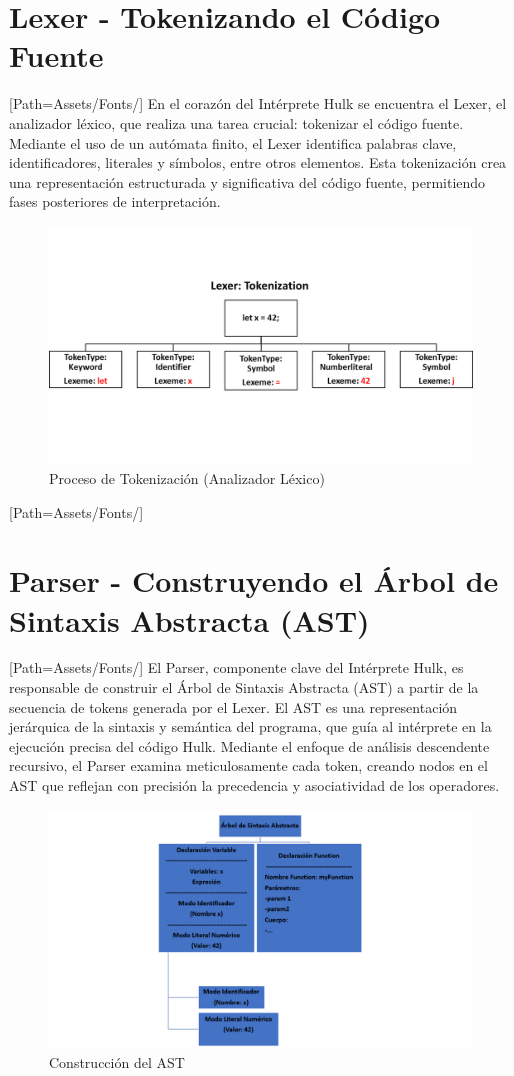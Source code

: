 \documentclass{article}
\begin{document}
\section{Lexer - Tokenizando el Código Fuente}
    \setmainfont{LEMONMILK-Regular.otf}[Path=Assets/Fonts/]
    En el corazón del Intérprete Hulk se encuentra el Lexer, el analizador léxico, que realiza una tarea crucial: tokenizar el código fuente. Mediante el uso de un autómata finito, el Lexer identifica palabras clave, identificadores, literales y símbolos, entre otros elementos. Esta tokenización crea una representación estructurada y significativa del código fuente, permitiendo fases posteriores de interpretación.
    \begin{figure}[ht]
        \centering
        \includegraphics[width=0.5\linewidth]{Assets/Tokenization.png} %
        \caption{Proceso de Tokenización (Analizador Léxico)}
        \label{fig:tokenizacion}
    \end{figure}
\newpage

\setmainfont{LEMONMILK-Bold.otf}[Path=Assets/Fonts/]
\section{Parser - Construyendo el Árbol de Sintaxis Abstracta (AST)}
    \setmainfont{LEMONMILK-Regular.otf}[Path=Assets/Fonts/]
    El Parser, componente clave del Intérprete Hulk, es responsable de construir el Árbol de Sintaxis Abstracta (AST) a partir de la secuencia de tokens generada por el Lexer. El AST es una representación jerárquica de la sintaxis y semántica del programa, que guía al intérprete en la ejecución precisa del código Hulk. Mediante el enfoque de análisis descendente recursivo, el Parser examina meticulosamente cada token, creando nodos en el AST que reflejan con precisión la precedencia y asociatividad de los operadores.
    \begin{figure}[ht]
        \centering
        \includegraphics[width=0.5\linewidth]{Assets/ArboldeSintaxisAbstracta.png} %
        \caption{Construcción del AST}
        \label{fig:AST}
    \end{figure}
\newpage
\end{document}
